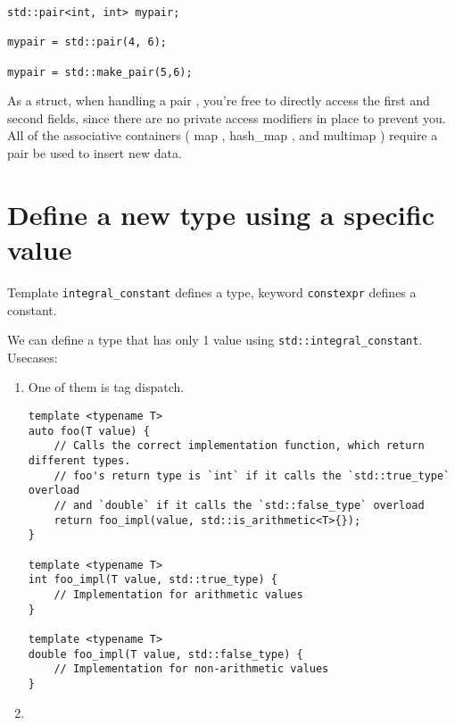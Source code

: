 \begin{verbatim}
std::pair<int, int> mypair;

mypair = std::pair(4, 6);

mypair = std::make_pair(5,6);
\end{verbatim}

As a struct, when handling a pair , you're free to directly access the first and
second fields, since there are no private access modifiers in place to prevent
you.
All of the associative containers ( map , hash\_map , and multimap ) require a
pair be used to insert new data.





\section{Define a new type using a specific value}


Template \verb!integral_constant! defines a type, keyword \verb!constexpr! defines a constant.

We can define a type that has only 1 value using \verb!std::integral_constant!.
Usecases:
\begin{enumerate}
  
  \item One of them is tag dispatch.

\begin{verbatim}
template <typename T>
auto foo(T value) {
    // Calls the correct implementation function, which return different types.
    // foo's return type is `int` if it calls the `std::true_type` overload
    // and `double` if it calls the `std::false_type` overload
    return foo_impl(value, std::is_arithmetic<T>{});
}

template <typename T>
int foo_impl(T value, std::true_type) {
    // Implementation for arithmetic values
}

template <typename T>
double foo_impl(T value, std::false_type) {
    // Implementation for non-arithmetic values
}
\end{verbatim}
 
  \item 
\end{enumerate}

